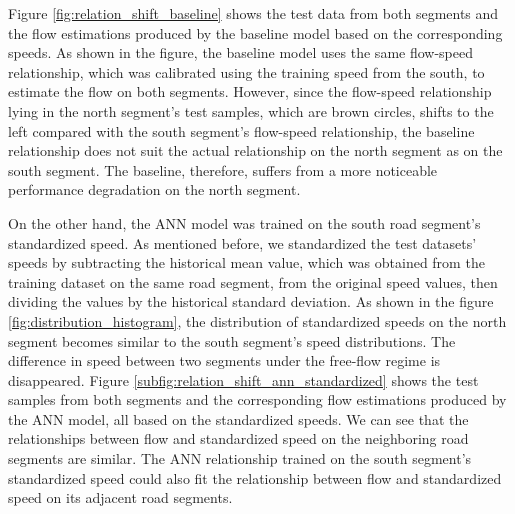 \documentclass[english]{kththesis}
\begin{document}
Figure \ref{fig:relation_shift_baseline} shows the test data from both segments and the flow estimations produced by the baseline model based on the corresponding speeds. As shown in the figure, the baseline model uses the same flow-speed relationship, which was calibrated using the training speed from the south, to estimate the flow on both segments. However, since the flow-speed relationship lying in the north segment's test samples, which are brown circles, shifts to the left compared with the south segment's flow-speed relationship, the baseline relationship does not suit the actual relationship on the north segment as on the south segment. The baseline, therefore, suffers from a more noticeable performance degradation on the north segment.

On the other hand, the ANN model was trained on the south road segment's standardized speed. As mentioned before, we standardized the test datasets' speeds by subtracting the historical mean value, which was obtained from the training dataset on the same road segment, from the original speed values, then dividing the values by the historical standard deviation. As shown in the figure \ref{fig:distribution_histogram}, the distribution of standardized speeds on the north segment becomes similar to the south segment's speed distributions. The difference in speed between two segments under the free-flow regime is disappeared. Figure \ref{subfig:relation_shift_ann_standardized} shows the test samples from both segments and the corresponding flow estimations produced by the ANN model, all based on the standardized speeds. We can see that the relationships between flow and standardized speed on the neighboring road segments are similar. The ANN relationship trained on the south segment's standardized speed could also fit the relationship between flow and standardized speed on its adjacent road segments.  
\end{document}
